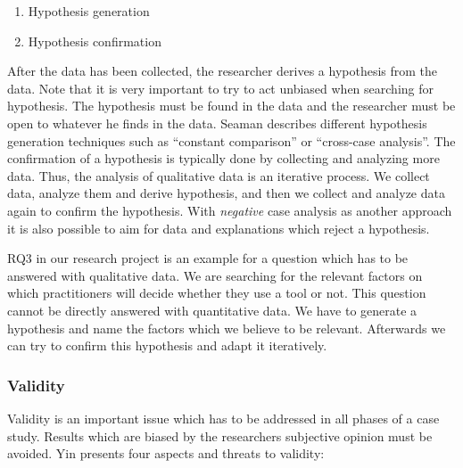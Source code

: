 \documentclass[runningheads]{llncs}
\begin{document}
\begin{enumerate}
	\item Hypothesis generation
	\item Hypothesis confirmation
\end{enumerate}
After the data has been collected, the researcher derives a hypothesis from the data. Note that it is very important to try to act unbiased when searching for hypothesis. The hypothesis must be found in the data and the researcher must be open to whatever he finds in the data. Seaman \cite{Seaman} describes different hypothesis generation techniques such as ``constant comparison'' or ``cross-case analysis''. The confirmation of a hypothesis is typically done by collecting and analyzing more data. Thus, the analysis of qualitative data is an iterative process. We collect data, analyze them and derive hypothesis, and then we collect and analyze data again to confirm the hypothesis. With \textit{negative} case analysis as another approach it is also possible to aim for data and explanations which reject a hypothesis.

RQ3 in our research project is an example for a question which has to be answered with qualitative data. We are searching for the relevant factors on which practitioners will decide whether they use a tool or not. This question cannot be directly answered with quantitative data. We have to generate a hypothesis and name the factors which we believe to be relevant. Afterwards we can try to confirm this hypothesis and adapt it iteratively.

\subsubsection{Validity}
Validity is an important issue which has to be addressed in all phases of a case study. Results which are biased by the researchers subjective opinion must be avoided. Yin \cite{yin2009case} presents four aspects and threats to validity:
\end{document}
